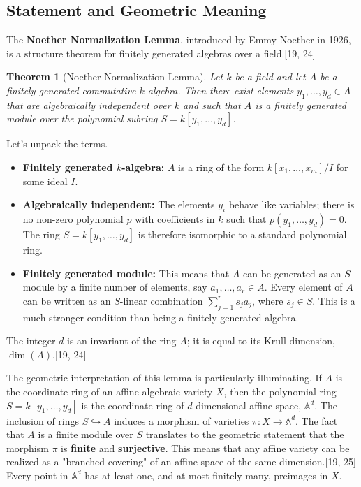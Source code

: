 \documentclass[11pt]{article}
\begin{document}
\subsection{Statement and Geometric Meaning}

The \textbf{Noether Normalization Lemma}, introduced by Emmy Noether in 1926, is a structure theorem for finitely generated algebras over a field.[19, 24]

\newtheorem{theorem}{Theorem}
\begin{theorem}[Noether Normalization Lemma]
Let $k$ be a field and let $A$ be a finitely generated commutative $k$-algebra. Then there exist elements $y_1, \ldots, y_d \in A$ that are algebraically independent over $k$ and such that $A$ is a finitely generated module over the polynomial subring $S = k[y_1, \ldots, y_d]$.
\end{theorem}

Let's unpack the terms.
\begin{itemize}
    \item \textbf{Finitely generated $k$-algebra:} $A$ is a ring of the form $k[x_1, \ldots, x_m]/I$ for some ideal $I$.
    \item \textbf{Algebraically independent:} The elements $y_i$ behave like variables; there is no non-zero polynomial $p$ with coefficients in $k$ such that $p(y_1, \ldots, y_d) = 0$. The ring $S = k[y_1, \ldots, y_d]$ is therefore isomorphic to a standard polynomial ring.
    \item \textbf{Finitely generated module:} This means that $A$ can be generated as an $S$-module by a finite number of elements, say $a_1, \ldots, a_r \in A$. Every element of $A$ can be written as an $S$-linear combination $\sum_{j=1}^r s_j a_j$, where $s_j \in S$. This is a much stronger condition than being a finitely generated algebra.
\end{itemize}

The integer $d$ is an invariant of the ring $A$; it is equal to its Krull dimension, $\dim(A)$.[19, 24]

The geometric interpretation of this lemma is particularly illuminating. If $A$ is the coordinate ring of an affine algebraic variety $X$, then the polynomial ring $S=k[y_1, \ldots, y_d]$ is the coordinate ring of $d$-dimensional affine space, $\mathbb{A}^d$. The inclusion of rings $S \hookrightarrow A$ induces a morphism of varieties $\pi: X \to \mathbb{A}^d$. The fact that $A$ is a finite module over $S$ translates to the geometric statement that the morphism $\pi$ is \textbf{finite} and \textbf{surjective}. This means that any affine variety can be realized as a "branched covering" of an affine space of the same dimension.[19, 25] Every point in $\mathbb{A}^d$ has at least one, and at most finitely many, preimages in $X$.
\end{document}
